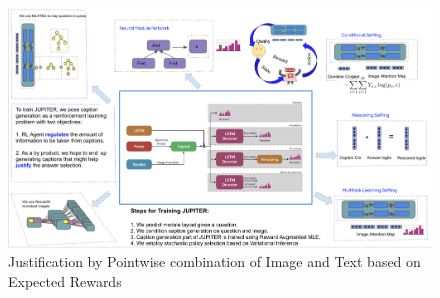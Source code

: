 \begin{figure}[h]
    \centering
    \includegraphics[scale=0.44, frame]{images/jupiter.png}
    \caption{Justification by Pointwise combination of Image and Text based on Expected Rewards}
    \label{fig:jupiter}
\end{figure}
    
    
